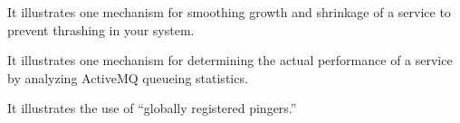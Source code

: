    It illustrates one mechanism for smoothing growth and shrinkage of a service
   to prevent thrashing in your system.

   It illustrates one mechanism for determining the actual performance of
   a service by analyzing ActiveMQ queueing statistics.
     
   It illustrates the use of ``globally registered pingers.''
